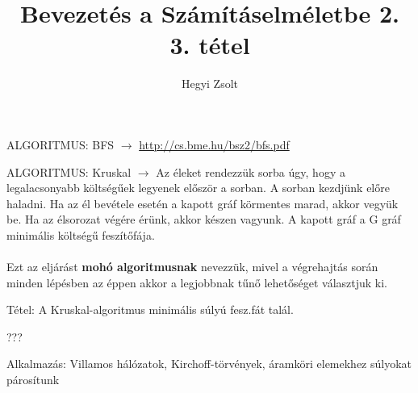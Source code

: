 \documentclass[]{article}
\title{Bevezetés a Számításelméletbe 2.\\{\large 3. tétel}}
\author{Hegyi Zsolt}
\begin{document}
\maketitle{}
\begin{framed}
ALGORITMUS: BFS $\rightarrow$ \url{http://cs.bme.hu/bsz2/bfs.pdf}
\end{framed}
\begin{framed}
ALGORITMUS: Kruskal $\rightarrow$ Az éleket rendezzük sorba úgy, hogy a legalacsonyabb költségűek legyenek először a sorban. A sorban kezdjünk előre haladni. Ha az él bevétele esetén a kapott gráf körmentes marad, akkor vegyük be. Ha az élsorozat végére érünk, akkor készen vagyunk. A kapott gráf a G gráf minimális költségű feszítőfája.
\\
\\
Ezt az eljárást \textbf{mohó algoritmusnak} nevezzük, mivel a végrehajtás során minden lépésben az éppen akkor a legjobbnak tűnő lehetőséget választjuk ki.
\end{framed}
\begin{framed}
Tétel: A Kruskal-algoritmus minimális súlyú fesz.fát talál.
\end{framed}
\begin{leftbar}
???
\end{leftbar}
\begin{framed}
Alkalmazás: Villamos hálózatok, Kirchoff-törvények, áramköri elemekhez súlyokat párosítunk
\end{framed}
\end{document}
